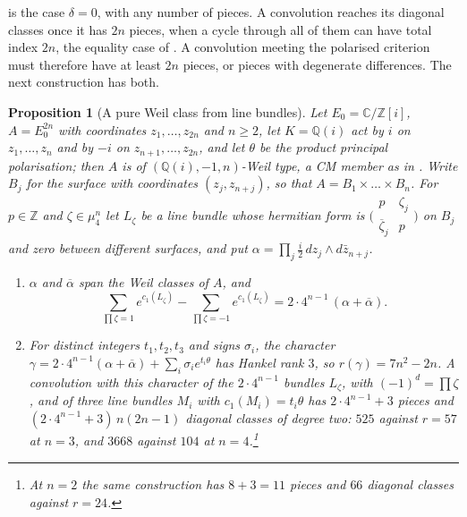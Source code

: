 \documentclass[11pt,reqno]{amsart}
\theoremstyle{plain}
\newtheorem{proposition}[theorem]{Proposition}
\theoremstyle{definition}
\theoremstyle{remark}
\newcommand{\QQ}{\mathbb{Q}}
\newcommand{\ZZ}{\mathbb{Z}}
\newcommand{\CC}{\mathbb{C}}
\newcommand{\bbar}[1]{\overline{#1}}
\begin{document}
\cite[Theorem~9.20]{paperI} is the case $\delta=0$, with any number of pieces. A
convolution reaches its diagonal classes once it has $2n$ pieces, when a
cycle through all of them can have total index $2n$, the equality case of
. A convolution meeting the polarised criterion must
therefore have at least $2n$ pieces, or pieces with degenerate differences.
The next construction has both.

\begin{proposition}[A pure Weil class from line bundles]
\label{prop:weilpieces}
Let $E_{0}=\CC/\ZZ[i]$, $A=E_{0}^{2n}$ with coordinates $z_{1},\dots,z_{2n}$
and $n\ge2$, let $K=\QQ(i)$ act by $i$ on $z_{1},\dots,z_{n}$ and by $-i$
on $z_{n+1},\dots,z_{2n}$, and let $\theta$ be the product principal
polarisation; then $A$ is of $(\QQ(i),-1,n)$-Weil type, a CM member as in
\cite[Remark~17.6]{paperI}. Write $B_{j}$ for the surface with coordinates
$(z_{j},z_{n+j})$, so that $A=B_{1}\times\dots\times B_{n}$. For $p\in\ZZ$
and $\zeta\in\mu_{4}^{n}$ let $L_{\zeta}$ be a line bundle whose hermitian
form is $\bigl(\begin{smallmatrix}p&\zeta_{j}\\ \bbar\zeta_{j}&p
\end{smallmatrix}\bigr)$ on $B_{j}$ and zero between different surfaces, and
put $\alpha=\prod_{j}\tfrac{i}{2}\,dz_{j}\wedge d\bar z_{n+j}$.
\begin{enumerate}[label=\textup{(\roman*)},leftmargin=2.6em,itemsep=2pt]
\item $\alpha$ and $\bbar\alpha$ span the Weil classes of $A$, and
  \[
    \sum_{\prod\zeta=1}e^{c_{1}(L_{\zeta})}
    -\sum_{\prod\zeta=-1}e^{c_{1}(L_{\zeta})}
    =2\cdot4^{n-1}\,(\alpha+\bbar\alpha).
  \]
\item For distinct integers $t_{1},t_{2},t_{3}$ and signs $\sigma_{i}$, the
  character
  $\gamma=2\cdot4^{n-1}(\alpha+\bbar\alpha)+\sum_{i}\sigma_{i}e^{t_{i}\theta}$
  has Hankel rank $3$, so $r(\gamma)=7n^{2}-2n$. A convolution with this
  character of the $2\cdot4^{n-1}$ bundles $L_{\zeta}$, with
  $(-1)^{d}=\prod\zeta$, and of three line bundles $M_{i}$ with
  $c_{1}(M_{i})=t_{i}\theta$ has $2\cdot4^{n-1}+3$ pieces and
  $(2\cdot4^{n-1}+3)\,n(2n-1)$ diagonal classes of degree two: $525$
  against $r=57$ at $n=3$, and $3668$ against $104$ at
  $n=4$.\footnote{At $n=2$ the same construction has $8+3=11$ pieces and
  $66$ diagonal classes against $r=24$.}
\end{enumerate}
\end{proposition}
\end{document}
